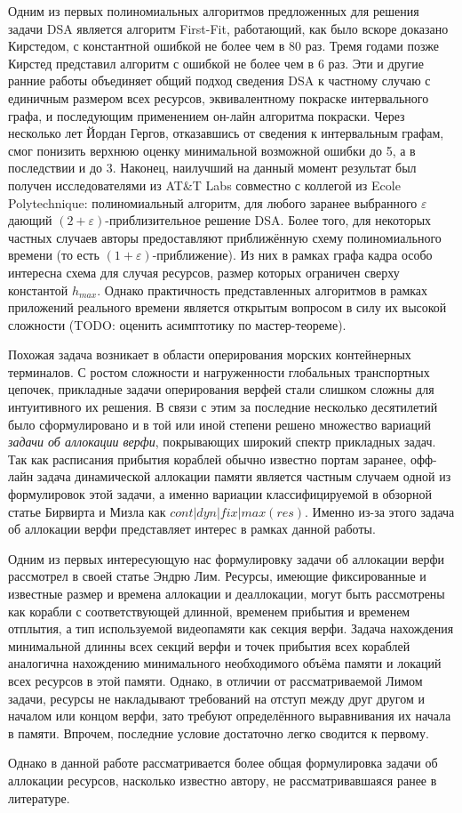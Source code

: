Одним из первых полиномиальных алгоритмов предложенных для решения задачи DSA является алгоритм First-Fit\cite{chrobak_packing_1988}, работающий, как было вскоре доказано Кирстедом, с константной ошибкой не более чем в 80 раз\cite{kierstead_linearity_1988}. Тремя годами позже Кирстед представил алгоритм с ошибкой не более чем в 6 раз\cite{kierstead_polynomial_1991}. Эти и другие ранние работы объединяет общий подход сведения DSA к частному случаю с единичным размером всех ресурсов, эквивалентному покраске интервального графа, и последующим применением он-лайн алгоритма покраски. Через несколько лет Йордан Гергов, отказавшись от сведения к интервальным графам, смог понизить верхнюю оценку минимальной возможной ошибки до 5\cite{gergov_approximation_1996}, а в последствии и до 3\cite{gergov_algorithms_1999}. Наконец, наилучший на данный момент результат был получен исследователями из AT\&T Labs совместно с коллегой из Ecole Polytechnique\cite{buchsbaum_opt_2003}: полиномиальный алгоритм, для любого заранее выбранного $\varepsilon$ дающий $(2+\varepsilon)$-приблизительное решение DSA. Более того, для некоторых частных случаев авторы предоставляют приближённую схему полиномиального времени (то есть $(1+\varepsilon)$-приближение). Из них в рамках графа кадра особо интересна схема для случая ресурсов, размер которых ограничен сверху константой $h_{max}$. Однако практичность представленных алгоритмов в рамках приложений реального времени является открытым вопросом в силу их высокой сложности (TODO: оценить асимптотику по мастер-теореме).

Похожая задача возникает в области оперирования морских контейнерных терминалов. С ростом сложности и нагруженности глобальных транспортных цепочек, прикладные задачи оперирования верфей стали слишком сложны для интуитивного их решения. В связи с этим за последние несколько десятилетий было сформулировано и в той или иной степени решено множество вариаций \textit{задачи об аллокации верфи}, покрывающих широкий спектр прикладных задач. Так как расписания прибытия кораблей обычно известно портам заранее, офф-лайн задача динамической аллокации памяти является частным случаем одной из формулировок этой задачи, а именно вариации классифицируемой в обзорной статье Бирвирта и Мизла\cite{BIERWIRTH2010615} как $cont|dyn|fix|max(res)$. Именно из-за этого задача об аллокации верфи представляет интерес в рамках данной работы.

Одним из первых интересующую нас формулировку задачи об аллокации верфи рассмотрел в своей статье Эндрю Лим\cite{LIM1998105}. Ресурсы, имеющие фиксированные и известные размер и времена аллокации и деаллокации, могут быть рассмотрены как корабли с соответствующей длинной, временем прибытия и временем отплытия, а тип используемой видеопамяти как секция верфи. Задача нахождения минимальной длинны всех секций верфи и точек прибытия всех кораблей аналогична нахождению минимального необходимого объёма памяти и локаций всех ресурсов в этой памяти. Однако, в отличии от рассматриваемой Лимом задачи, ресурсы не накладывают требований на отступ между друг другом и началом или концом верфи, зато требуют определённого выравнивания их начала в памяти. Впрочем, последние условие достаточно легко сводится к первому.

Однако в данной работе рассматривается более общая формулировка задачи об аллокации ресурсов, насколько известно автору, не рассматривавшаяся ранее в литературе.

